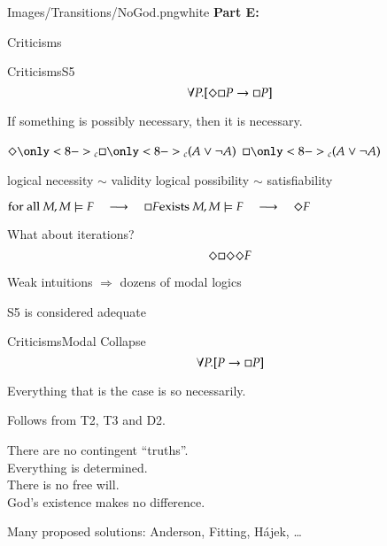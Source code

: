 \begin{transitionframe}{Images/Transitions/NoGod.png}{white}
\textbf{Part E:}

Criticisms
\end{transitionframe}

\begin{frame}{Criticisms}{S5} \centering
$$
\forall P.[ \Diamond \Box P \rightarrow \Box P ] 
$$

\medskip

If something is possibly necessary, then it is necessary.

\pause

\bigskip


$
\pos\only<8->{_c} \nec\only<8->{_c} (A \vee \neg A)
$
\pause
\qquad 
$
\nec\only<8->{_c} (A \vee \neg A)
$

\pause

\bigskip

logical necessity $\sim$ validity
\hfill
logical possibility $\sim$ satisfiability

\pause 

\medskip

$ 
\textrm{for all } M, M \models F 
\quad \longrightarrow \quad
\nec F
\hfill
\textrm{exists } M, M \models F 
\quad \longrightarrow \quad
\pos F
$

\pause

\bigskip

What about iterations?
$$
\Diamond \Box \Diamond \Diamond F
$$

\medskip

\pause

Weak intuitions $\Rightarrow$ dozens of modal logics

\medskip

\pause

\alert{S5 is considered adequate}


\end{frame}


\begin{frame}{Criticisms}{Modal Collapse} \centering
$$
\forall P.[ P \rightarrow \Box P ] 
$$

\medskip

Everything that is the case is so necessarily.

\pause

\medskip

Follows from T2, T3 and D2.

\pause

\medskip

There are no contingent ``truths''. \\ \pause
Everything is determined. \\ \pause
There is no free will. \\ \pause
God's existence makes no difference.

\pause
\bigskip

Many proposed solutions: Anderson, Fitting, H\'ajek, \ldots
 
\end{frame}



